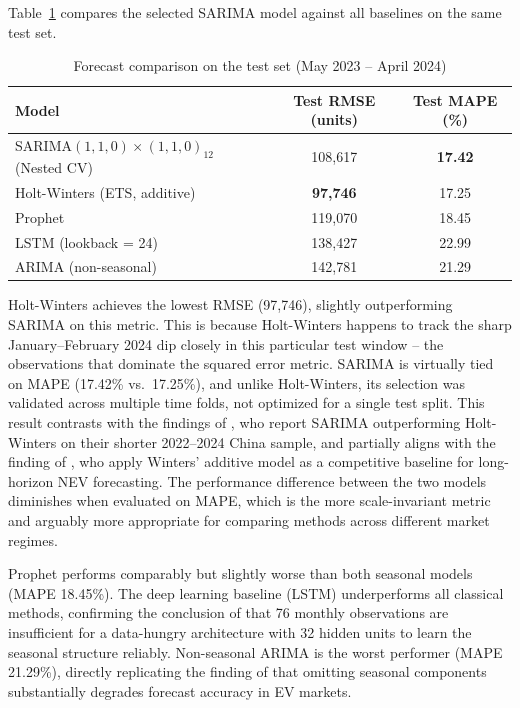 \documentclass[12pt]{article}
\begin{document}
Table~\ref{tab:baselines} compares the selected SARIMA model against all baselines on the same test set.

\begin{table}[H]
\centering
\caption{Forecast comparison on the test set (May 2023 -- April 2024)}
\label{tab:baselines}
\begin{tabular}{lcc}
\toprule
Model & Test RMSE (units) & Test MAPE (\%) \\
\midrule
SARIMA$(1,1,0)\times(1,1,0)_{12}$ (Nested CV) & 108,617 & \textbf{17.42} \\
Holt-Winters (ETS, additive) & \textbf{97,746} & 17.25 \\
Prophet & 119,070 & 18.45 \\
LSTM (lookback = 24) & 138,427 & 22.99 \\
ARIMA (non-seasonal) & 142,781 & 21.29 \\
\bottomrule
\end{tabular}
\end{table}

Holt-Winters achieves the lowest RMSE (97,746), slightly outperforming SARIMA on this metric. This is because Holt-Winters happens to track the sharp January--February 2024 dip closely in this particular test window -- the observations that dominate the squared error metric. SARIMA is virtually tied on MAPE (17.42\% vs.\ 17.25\%), and unlike Holt-Winters, its selection was validated across multiple time folds, not optimized for a single test split. This result contrasts with the findings of \citet{chen2025}, who report SARIMA outperforming Holt-Winters on their shorter 2022--2024 China sample, and partially aligns with the finding of \citet{ge2024}, who apply Winters' additive model as a competitive baseline for long-horizon NEV forecasting. The performance difference between the two models diminishes when evaluated on MAPE, which is the more scale-invariant metric and arguably more appropriate for comparing methods across different market regimes.

Prophet performs comparably but slightly worse than both seasonal models (MAPE 18.45\%). The deep learning baseline (LSTM) underperforms all classical methods, confirming the conclusion of \citet{cetin2024} that 76 monthly observations are insufficient for a data-hungry architecture with 32 hidden units to learn the seasonal structure reliably. Non-seasonal ARIMA is the worst performer (MAPE 21.29\%), directly replicating the finding of \citet{lu2024} that omitting seasonal components substantially degrades forecast accuracy in EV markets.
\end{document}
